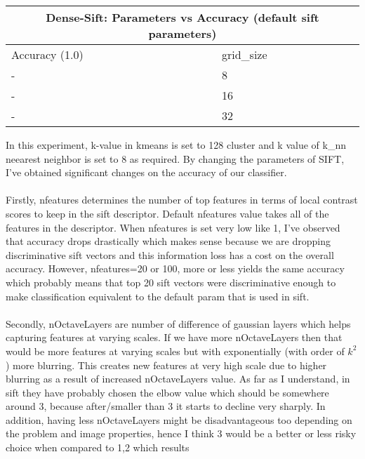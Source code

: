 \documentclass[12pt]{article}
\begin{document}
        \vspace*{0.5cm}
        \begin{tabular}{ |p{1.5cm}||p{3cm}| }
            \hline
            \multicolumn{2}{|c|}{Dense-Sift: Parameters vs Accuracy (default sift parameters)} \\
            \hline
            Accuracy (1.0) & grid\_size \\
            \hline
            - & 8 \\ %
            \hline
            - & 16 \\ %
            \hline
            - & 32 \\ %
            \hline
        \end{tabular}


    \begin{center}
        \raggedright
        In this experiment, k-value in kmeans is set to 128 cluster and k value of k\_nn neearest neighbor is set to 8 as required.
        By changing the parameters of SIFT, I've obtained significant changes on the accuracy of our classifier.
        \\~\\
        Firstly, nfeatures determines the number of top features in terms of local contrast scores to keep in the sift descriptor. 
        Default nfeatures value takes all of the features in the descriptor. When nfeatures is set very low like 1, I've observed that accuracy drops drastically
        which makes sense because we are dropping discriminative sift vectors and this information loss has a cost on the overall accuracy.
        However, nfeatures=20 or 100, more or less yields the same accuracy which probably means that top 20 sift vectors were discriminative enough to make 
        classification equivalent to the default param that is used in sift.
        \\~\\
        Secondly, nOctaveLayers are number of difference of gaussian layers which helps capturing features at varying scales.
        If we have more nOctaveLayers then that would be more features at varying scales but with exponentially (with order of $k^{2}$) more blurring.
        This creates new features at very high scale due to higher blurring as a result of increased nOctaveLayers value.
        As far as I understand, in sift they have probably chosen the elbow value which should be somewhere around 3, because after/smaller than 3 it starts to decline very sharply.
        In addition, having less nOctaveLayers might be disadvantageous too depending on the problem and image properties, hence I think 3 would be a better or less risky choice when compared to 1,2 which results

\end{center}
\end{document}
